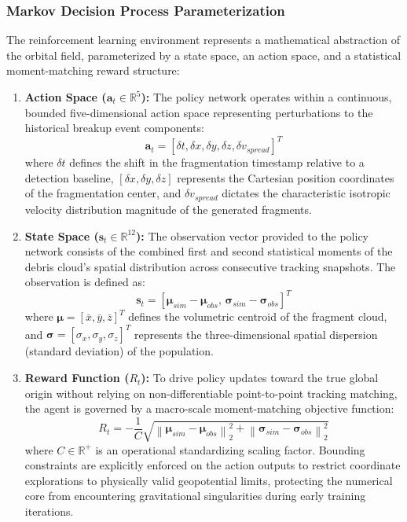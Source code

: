 \documentclass[letterpaper,11pt]{AAS}
\begin{document}
\subsubsection{Markov Decision Process Parameterization}
The reinforcement learning environment represents a mathematical abstraction of the orbital field, parameterized by a state space, an action space, and a statistical moment-matching reward structure:
\begin{enumerate}
    \item \textbf{Action Space ($\mathbf{a}_t \in \mathbb{R}^5$):} The policy network operates within a continuous, bounded five-dimensional action space representing perturbations to the historical breakup event components:
    \begin{equation}
        \mathbf{a}_t = \left[ \delta t, \delta x, \delta y, \delta z, \delta v_{spread} \right]^T
        \label{eq:ppo_action_space}
    \end{equation}
    where $\delta t$ defines the shift in the fragmentation timestamp relative to a detection baseline, $[\delta x, \delta y, \delta z]$ represents the Cartesian position coordinates of the fragmentation center, and $\delta v_{spread} $ dictates the characteristic isotropic velocity distribution magnitude of the generated fragments.
    
    \item \textbf{State Space ($\mathbf{s}_t \in \mathbb{R}^{12}$):} The observation vector provided to the policy network consists of the combined first and second statistical moments of the debris cloud's spatial distribution across consecutive tracking snapshots. The observation is defined as:
    \begin{equation}
        \mathbf{s}_t = \left[ \boldsymbol{\mu}_{sim} - \boldsymbol{\mu}_{obs}, \, \boldsymbol{\sigma}_{sim} - \boldsymbol{\sigma}_{obs} \right]^T
        \label{eq:ppo_state_space}
    \end{equation}
    where $\boldsymbol{\mu} = [\bar{x}, \bar{y}, \bar{z}]^T$ defines the volumetric centroid of the fragment cloud, and $\boldsymbol{\sigma} = [\sigma_x, \sigma_y, \sigma_z]^T$ represents the three-dimensional spatial dispersion (standard deviation) of the population.
    
    \item \textbf{Reward Function ($R_t$):} To drive policy updates toward the true global origin without relying on non-differentiable point-to-point tracking matching, the agent is governed by a macro-scale moment-matching objective function:
    \begin{equation}
        R_t = - \frac{1}{C} \sqrt{ \left\| \boldsymbol{\mu}_{sim} - \boldsymbol{\mu}_{obs} \right\|_2^2 + \left\| \boldsymbol{\sigma}_{sim} - \boldsymbol{\sigma}_{obs} \right\|_2^2 }
        \label{eq:ppo_reward}
    \end{equation}
    where $C \in \mathbb{R}^+$ is an operational standardizing scaling factor. Bounding constraints are explicitly enforced on the action outputs to restrict coordinate explorations to physically valid geopotential limits, protecting the numerical core from encountering gravitational singularities during early training iterations.
\end{enumerate}
\end{document}
